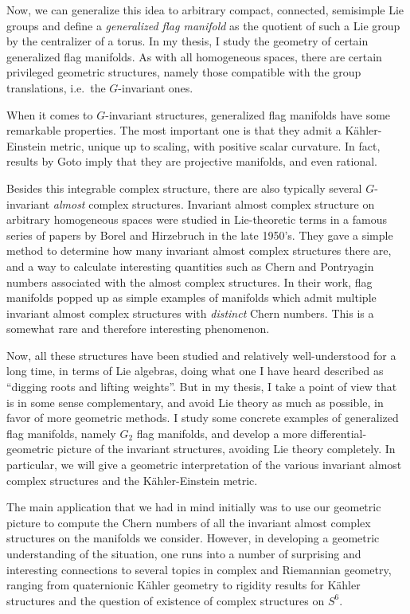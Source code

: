 \documentclass[parskip=half]{scrartcl}
\begin{document}
Now, we can generalize this idea to arbitrary compact, connected, semisimple Lie groups and define a \emph{generalized flag manifold} as the quotient of such a Lie group by the centralizer of a torus. In my thesis, I study the geometry of certain generalized flag manifolds. As with all homogeneous spaces, there are certain privileged geometric structures, namely those compatible with the group translations, i.e.~the $G$-invariant ones.

When it comes to $G$-invariant structures, generalized flag manifolds have some remarkable properties. The most important one is that they admit a K\"ahler-Einstein metric, unique up to scaling, with positive scalar curvature. In fact, results by Goto imply that they are projective manifolds, and even rational. 

Besides this integrable complex structure, there are also typically several $G$-invariant \emph{almost} complex structures. Invariant almost complex structure on arbitrary homogeneous spaces were studied in Lie-theoretic terms in a famous series of papers by Borel and Hirzebruch in the late 1950's. They gave a simple method to determine how many invariant almost complex structures there are, and a way to calculate interesting quantities such as Chern and Pontryagin numbers associated with the almost complex structures. In their work, flag manifolds popped up as simple examples of manifolds which admit multiple invariant almost complex structures with \emph{distinct} Chern numbers. This is a somewhat rare and therefore interesting phenomenon.

Now, all these structures have been studied and relatively well-understood for a long time, in terms of Lie algebras, doing what one I have heard described as ``digging roots and lifting weights''. But in my thesis, I take a point of view that is in some sense complementary, and avoid Lie theory as much as possible, in favor of more geometric methods. I study some concrete examples of generalized flag manifolds, namely $G_2$ flag manifolds, and develop a more differential-geometric picture of the invariant structures, avoiding Lie theory completely. In particular, we will give a geometric interpretation of the various invariant almost complex structures and the K\"ahler-Einstein metric.

The main application that we had in mind initially was to use our geometric picture to compute the Chern numbers of all the invariant almost complex structures on the manifolds we consider. However, in developing a geometric understanding of the situation, one runs into a number of surprising and interesting connections to several topics in complex and Riemannian geometry, ranging from quaternionic K\"ahler geometry to rigidity results for K\"ahler structures and the question of existence of complex structures on $S^6$.
\end{document}
